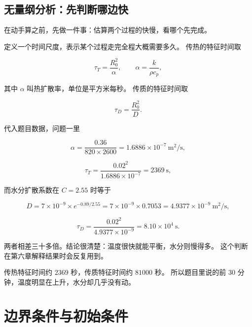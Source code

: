 \subsection{无量纲分析：先判断哪边快}

在动手算之前，先做一件事：估算两个过程的快慢，看哪个先完成。

定义一个时间尺度，表示某个过程走完全程大概需要多久。
传热的特征时间取

\begin{equation}
\tau_T = \frac{R_0^2}{\alpha}, \qquad \alpha = \frac{k}{\rho c_p},
\end{equation}

其中 $\alpha$ 叫热扩散率，单位是平方米每秒。
传质的特征时间取

\begin{equation}
\tau_D = \frac{R_0^2}{D}.
\end{equation}

代入题目数据，问题一里

\begin{equation}
\alpha = \frac{0.36}{820\times2600} = 1.6886\times10^{-7}\ \mathrm{m^2/s},
\end{equation}

\begin{equation}
\tau_T = \frac{0.02^2}{1.6886\times10^{-7}} = 2369\ \mathrm{s},
\end{equation}

而水分扩散系数在 $C=2.55$ 时等于

\begin{equation}
D = 7\times10^{-9}\times e^{-0.89/2.55} = 7\times10^{-9}\times0.7053
= 4.9377\times10^{-9}\ \mathrm{m^2/s},
\end{equation}

\begin{equation}
\tau_D = \frac{0.02^2}{4.9377\times10^{-9}} = 8.10\times10^4\ \mathrm{s}.
\end{equation}

两者相差三十多倍。结论很清楚：温度很快就能平衡，水分则慢得多。
这个判断在第六章解释结果时会反复用到。

\keypoint
传热特征时间约 $2369$ 秒，传质特征时间约 $81000$ 秒。
所以题目里说的前 $30$ 分钟，温度明显在上升，水分却几乎没有动。

\section{边界条件与初始条件}

